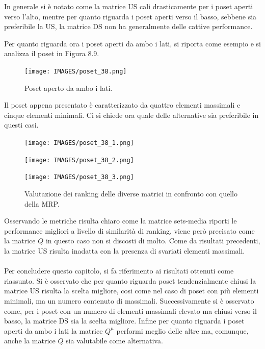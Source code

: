 \documentclass{report}
\begin{document}
In generale si è notato come la matrice US cali drasticamente per i poset aperti verso l'alto, mentre per quanto riguarda i poset aperti verso il basso, sebbene sia preferibile la US, la matrice DS non ha generalmente delle cattive performance. 


Per quanto riguarda ora i poset aperti da ambo i lati, si riporta come esempio e si analizza il poset in Figura 8.9.

\begin{figure}[H]
    \centering
    \texttt{[image: IMAGES/poset\_38.png]}
    \caption{Poset aperto da ambo i lati.}
    \label{fig:roc}
\end{figure}

Il poset appena presentato è caratterizzato da quattro elementi massimali e cinque elementi minimali. Ci si chiede ora quale delle alternative sia preferibile in questi casi.

\begin{figure}[H]
  \centering
  \begin{minipage}[b]{0.4\textwidth}
    \texttt{[image: IMAGES/poset\_38\_1.png]}
  \end{minipage}
  \hfill
  \begin{minipage}[b]{0.4\textwidth}
    \texttt{[image: IMAGES/poset\_38\_2.png]}
  \end{minipage}
  \hfill
  \begin{minipage}[b]{0.4\textwidth}
    \texttt{[image: IMAGES/poset\_38\_3.png]}
  \end{minipage}
  \caption{Valutazione dei ranking delle diverse matrici in confronto con quello della MRP.}
\end{figure}

Osservando le metriche risulta chiaro come la matrice sets-media riporti le performance migliori a livello di similarità di ranking, viene però precisato come la matrice $Q$ in questo caso non si discosti di molto. Come da risultati precedenti, la matrice US risulta inadatta con la presenza di svariati elementi massimali.
\\~\\
Per concludere questo capitolo, si fa riferimento ai risultati ottenuti come riassunto. Si è osservato che per quanto riguarda poset tendenzialmente chiusi la matrice US risulta la scelta migliore, cosi come nel caso di poset con più elementi minimali, ma un numero contenuto di massimali. Successivamente si è osservato come, per i poset con un numero di elementi massimali elevato ma chiusi verso il basso, la matrice DS sia la scelta migliore. Infine per quanto riguarda i poset aperti da ambo i lati la matrice $Q^{\mu}$ performi meglio delle altre ma, comunque, anche la matrice $Q$ sia valutabile come alternativa.
\end{document}
